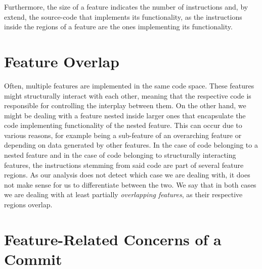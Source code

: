 Furthermore, the size of a feature indicates the number of instructions and, by extend, the source-code that implements its functionality, as the instructions inside the regions of a feature are the ones implementing its functionality.

\section{Feature Overlap}\label{sec:feature_overlap}

Often, multiple features are implemented in the same code space.
These features might structurally interact with each other, meaning that the respective code is responsible for controlling the interplay between them.
On the other hand, we might be dealing with a feature nested inside larger ones that encapsulate the code implementing functionality of the nested feature.
This can occur due to various reasons, for example being a sub-feature of an overarching feature or depending on data generated by other features.
In the case of code belonging to a nested feature and in the case of code belonging to structurally interacting features, the instructions stemming from said code are part of several feature regions.
As our analysis does not detect which case we are dealing with, it does not make sense for us to differentiate between the two.
We say that in both cases we are dealing with at least partially \emph{overlapping features}, as their respective regions overlap.

\section{Feature-Related Concerns of a Commit}\label{sec:commit_concerns}

